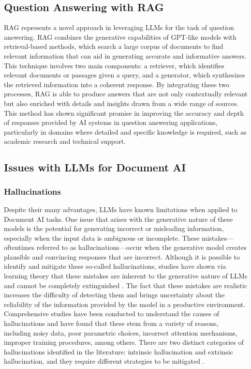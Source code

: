 \documentclass[english, 12pt, a4paper, elec, utf8, a-2b, online]{aaltothesis}
\begin{document}
\subsection{Question Answering with RAG}

\ac{RAG} represents a novel approach in leveraging \ac{LLM}s for the task of question answering.
\ac{RAG} combines the generative capabilities of GPT-like models with retrieval-based methods, which search a large corpus of documents to find relevant information that can aid in generating accurate and informative answers.
This technique involves two main components: a retriever, which identifies relevant documents or passages given a query, and a generator, which synthesizes the retrieved information into a coherent response.
By integrating these two processes, \ac{RAG} is able to produce answers that are not only contextually relevant but also enriched with details and insights drawn from a wide range of sources.
This method has shown significant promise in improving the accuracy and depth of responses provided by \ac{AI} systems in question answering applications, particularly in domains where detailed and specific knowledge is required, such as academic research and technical support.

\subsection{Issues with LLMs for Document AI}

\subsubsection{Hallucinations}

Despite their many advantages, \ac{LLM}s have known limitations when applied to Document \ac{AI} tasks.
One issue that arises with the generative nature of these models is the potential for generating incorrect or misleading information, especially when the input data is ambiguous or incomplete.
These mistakes—oftentimes referred to as hallucinations—occur when the generative model creates plausible and convincing responses that are incorrect.
Although it is possible to identify and mitigate these so-called hallucinations, studies have shown via learning theory that these mistakes are inherent to the generative nature of \ac{LLM}s and cannot be completely extinguished \cite{xu2024hallucination}.
The fact that these mistakes are realistic increases the difficulty of detecting them and brings uncertainty about the reliability of the information provided by the model in a productive environment.
Comprehensive studies have been conducted to understand the causes of hallucinations and have found that these stem from a variety of reasons, including noisy data, poor parametric choices, incorrect attention mechanisms, improper training procedures, among others.
There are two distinct categories of hallucinations identified in the literature: intrinsic hallucination and extrinsic hallucination, and they require different strategies to be mitigated \cite{survey_hallucination_natural_language_generation}.
\end{document}
